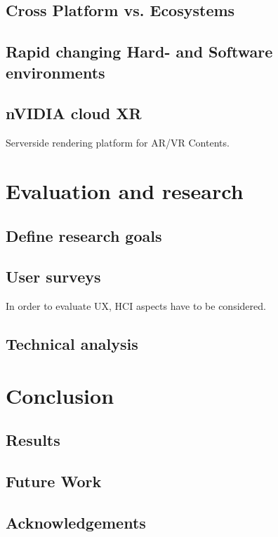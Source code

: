 \documentclass[titlepage, a4paper, 11pt]{scrartcl}
\begin{document}
        \subsection{Cross Platform vs. Ecosystems}

        \subsection{Rapid changing Hard- and Software environments}
		
		\subsection{nVIDIA cloud XR}
			Serverside rendering platform for AR/VR Contents.

    \section{Evaluation and research}

        \subsection{Define research goals}

        \subsection{User surveys}

            In order to evaluate UX, HCI aspects have to be considered.

        \subsection{Technical analysis}

    \section{Conclusion}

        \subsection{Results}

        \subsection{Future Work}

        \subsection{Acknowledgements}



     
    
\end{document}
